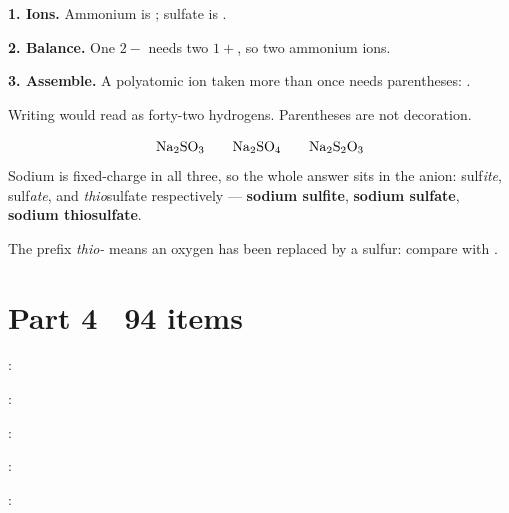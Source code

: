 \documentclass{apchem-worksheet}
\begin{document}
\begin{workedexample}
\textbf{1. Ions.} Ammonium is ; sulfate is .

\textbf{2. Balance.} One $2-$ needs two $1+$, so two ammonium ions.

\textbf{3. Assemble.} A polyatomic ion taken more than once needs
parentheses: .

Writing  would read as forty-two hydrogens. Parentheses are not
decoration.
\end{workedexample}

\begin{workedexample}
\[ \ce{Na2SO3} \qquad \ce{Na2SO4} \qquad \ce{Na2S2O3} \]
Sodium is fixed-charge in all three, so the whole answer sits in the anion:
sulf\emph{ite}, sulf\emph{ate}, and \emph{thio}sulfate respectively ---
\textbf{sodium sulfite}, \textbf{sodium sulfate},
\textbf{sodium thiosulfate}.

The prefix \emph{thio-} means an oxygen has been replaced by a sulfur:
compare  with .
\end{workedexample}

\section*{\sffamily Part 4 \textbullet\ 94 items}

\begin{parts}
  \item {} 
  \item {} 
  \item {} 
  \item {} 
  \item {} 
  \item {} 
\end{parts}

\begin{parts}
  \item {}: 
  \item {}: 
  \item {}: 
  \item {}: 
  \item {}: 
\end{parts}
\end{document}

